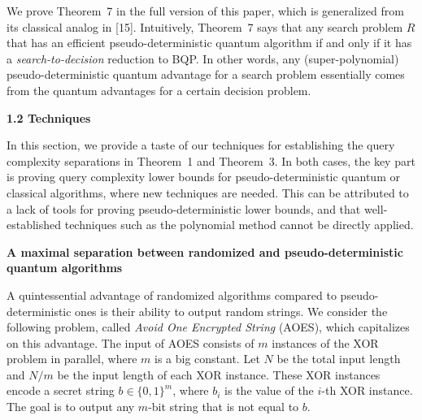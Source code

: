 \documentclass[10pt,a4paper]{article}
\begin{document}



We prove Theorem 7 in the full version of this paper, which is generalized from its classical analog in [15]. Intuitively, Theorem 7 says that any search problem $R$ that has an efficient pseudo-deterministic quantum algorithm if and only if it has a \emph{search-to-decision} reduction to BQP. In other words, any (super-polynomial) pseudo-deterministic quantum advantage for a search problem essentially comes from the quantum advantages for a certain decision problem.\par







\par\medskip\noindent\textbf{
1.2 Techniques}\par




In this section, we provide a taste of our techniques for establishing the query complexity separations in Theorem 1 and Theorem 3. In both cases, the key part is proving query complexity lower bounds for pseudo-deterministic quantum or classical algorithms, where new techniques are needed. This can be attributed to a lack of tools for proving pseudo-deterministic lower bounds, and that well-established techniques such as the polynomial method cannot be directly applied.\par




\par\medskip\noindent\textbf{A maximal separation between randomized and pseudo-deterministic quantum algorithms}\par




A quintessential advantage of randomized algorithms compared to pseudo-deterministic ones is their ability to output random strings.
We consider the following problem, called \emph{Avoid One Encrypted String} (AOES), which capitalizes on this advantage. The input of AOES consists of $m$ instances of the XOR problem in parallel, where $m$ is a big constant. Let $N$ be the total input length and $N/m$ be the input length of each XOR instance. These XOR instances encode a secret string $b\in\{0,1\}^{m}$, where $b_{i}$ is the value of the $i$-th XOR instance. The goal is to output any $m$-bit string that is not equal to $b$.\par
\end{document}
